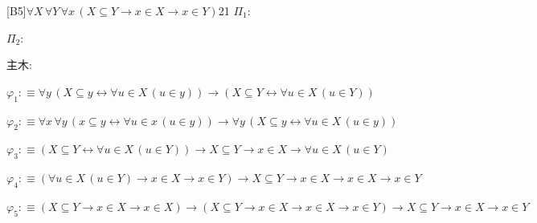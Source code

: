 \begin{fullproof}{[B5]}{$\forall X\,\forall Y\,\forall x\,(X \subseteq Y \to x \in X \to x \in Y)$}{21}\label{tree:SubElem}
\noindent$\Pi_{1}$:
\begin{ptree}
\end{ptree}
\noindent$\Pi_{2}$:
\begin{ptree}
\noLine
{}
\end{ptree}
\noindent 主木:
\begin{ptree}
\noLine
{}
\end{ptree}
\begin{abbrevlist}
\item $\varphi_{1} :\equiv \forall y\,(X \subseteq y \leftrightarrow \forall u \in X\,(u \in y)) \to (X \subseteq Y \leftrightarrow \forall u \in X\,(u \in Y))$
\item $\varphi_{2} :\equiv \forall x\,\forall y\,(x \subseteq y \leftrightarrow \forall u \in x\,(u \in y)) \to \forall y\,(X \subseteq y \leftrightarrow \forall u \in X\,(u \in y))$
\item $\varphi_{3} :\equiv (X \subseteq Y \leftrightarrow \forall u \in X\,(u \in Y)) \to X \subseteq Y \to x \in X \to \forall u \in X\,(u \in Y)$
\item $\varphi_{4} :\equiv (\forall u \in X\,(u \in Y) \to x \in X \to x \in Y) \to X \subseteq Y \to x \in X \to x \in X \to x \in Y$
\item $\varphi_{5} :\equiv (X \subseteq Y \to x \in X \to x \in X) \to (X \subseteq Y \to x \in X \to x \in X \to x \in Y) \to X \subseteq Y \to x \in X \to x \in Y$
\end{abbrevlist}
\end{fullproof}
